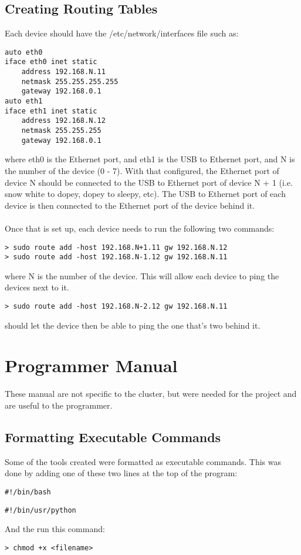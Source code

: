 \subsection{Creating Routing Tables}
Each device should have the /etc/network/interfaces file such as: \\
\begin{lstlisting}
auto eth0
iface eth0 inet static
	address 192.168.N.11
	netmask 255.255.255.255
	gateway 192.168.0.1
auto eth1
iface eth1 inet static 
	address 192.168.N.12
	netmask 255.255.255
	gateway 192.168.0.1
\end{lstlisting}
where eth0 is the Ethernet port, and eth1 is the USB to Ethernet port, and N is the number of the device (0 - 7). With that configured, the Ethernet port of device N should be connected to the USB to Ethernet port of device N + 1 (i.e. snow white to dopey, dopey to sleepy, etc). The USB to Ethernet port of each device is then connected to the Ethernet port of the device behind it. \\ \\
Once that is set up, each device needs to run the following two commands:
\begin{lstlisting}
> sudo route add -host 192.168.N+1.11 gw 192.168.N.12
> sudo route add -host 192.168.N-1.12 gw 192.168.N.11
\end{lstlisting}
where N is the number of the device. This will allow each device to ping the devices next to it. 
\begin{lstlisting}
> sudo route add -host 192.168.N-2.12 gw 192.168.N.11
\end{lstlisting}
should let the device then be able to ping the one that's two behind it. 

\section{Programmer Manual}
These manual are not specific to the cluster, but were needed for the project and are useful to the programmer.
\subsection{Formatting Executable Commands}
Some of the tools created were formatted as executable commands. This was done by adding one of these two lines at the top of the program:
\begin{lstlisting}
#!/bin/bash
\end{lstlisting}
\begin{lstlisting}
#!/bin/usr/python
\end{lstlisting}
And the run this command:
\begin{lstlisting}
> chmod +x <filename>
\end{lstlisting}
